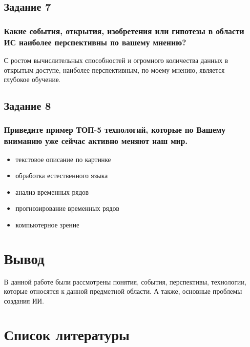 \documentclass[14pt,a4paper,report]{report}
\begin{document}
\subsection{Задание 7}

\subsubsection{Какие события, открытия, изобретения или гипотезы в области ИС наиболее перспективны по вашему мнению?}

С ростом вычислительных способностей и огромного количества данных в открытым доступе, наиболее перспективным, по-моему мнению, является глубокое обучение.

\subsection{Задание 8}

\subsubsection{Приведите пример ТОП-5 технологий, которые по Вашему вниманию уже сейчас активно меняют наш мир.}

\begin{itemize}
	\item текстовое описание по картинке
	\item обработка естественного языка
	\item анализ временных рядов
	\item прогнозирование временных рядов
	\item компьютерное зрение
\end{itemize}

\section{Вывод}

В данной работе были рассмотрены понятия, события, перспективы, технологии, которые относятся к данной предметной области. А также, основные проблемы создания ИИ.

\clearpage

\section{Список литературы}


\end{document}
